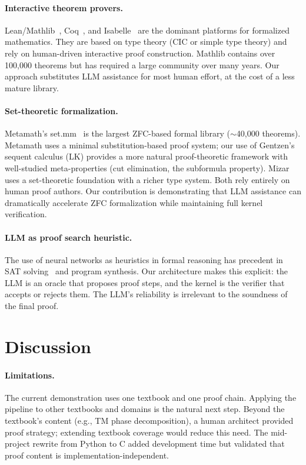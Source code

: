 \documentclass[letterpaper]{article}
\begin{document}
\paragraph{Interactive theorem provers.}
Lean/Mathlib~\citep{mathlib2020}, Coq~\citep{coq}, and Isabelle~\citep{isabelle}
are the dominant platforms for formalized mathematics. They are based on type theory
(CIC or simple type theory) and rely on human-driven interactive proof construction.
Mathlib contains over 100,000 theorems but has required a large community over
many years. Our approach substitutes LLM assistance for most human effort, at the
cost of a less mature library.

\paragraph{Set-theoretic formalization.}
Metamath's set.mm~\citep{metamath} is the largest ZFC-based formal library
($\sim$40,000 theorems). Metamath uses a minimal substitution-based proof
system; our use of Gentzen's sequent calculus (LK) provides a more natural
proof-theoretic framework with well-studied meta-properties (cut elimination,
the subformula property). Mizar~\citep{mizar} uses a set-theoretic foundation
with a richer type system. Both rely entirely on human proof authors. Our
contribution is demonstrating that LLM assistance can dramatically accelerate
ZFC formalization while maintaining full kernel verification.

\paragraph{LLM as proof search heuristic.}
The use of neural networks as heuristics in formal reasoning has precedent in
SAT solving~\citep{selsam2019learning} and program synthesis. Our architecture
makes this explicit: the LLM is an oracle that proposes proof steps, and the
kernel is the verifier that accepts or rejects them. The LLM's reliability is
irrelevant to the soundness of the final proof.

\section{Discussion}
\label{sec:discussion}

\paragraph{Limitations.}
The current demonstration uses one textbook and one proof chain.
Applying the pipeline to other textbooks and domains is the natural next
step. Beyond the textbook's content (e.g., TM phase decomposition), a
human architect provided proof strategy; extending textbook coverage
would reduce this need. The mid-project rewrite from Python to C added
development time but validated that proof content is implementation-independent.
\end{document}

